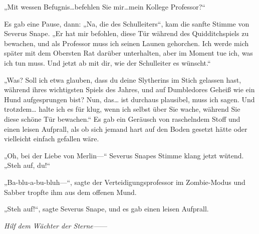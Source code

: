 „Mit wessen Befugnis…befehlen Sie mir…mein Kollege Professor?“

Es gab eine Pause, dann: „Na, die des Schulleiters“, kam die sanfte Stimme von Severus Snape. „Er hat mir befohlen, diese Tür während des Quidditchspiels zu bewachen, und als Professor muss ich seinen Launen gehorchen. Ich werde mich später mit dem Obersten Rat darüber unterhalten, aber im Moment tue ich, was ich tun muss. Und jetzt ab mit dir, wie der Schulleiter es wünscht.“

„Was? Soll ich etwa glauben, dass du deine Slytherins im Stich gelassen hast, während ihres wichtigsten Spiels des Jahres, und auf Dumbledores Geheiß wie ein Hund aufgesprungen bist? Nun, das… ist durchaus plausibel, muss ich sagen. Und trotzdem… halte ich es für klug, wenn ich selbst über Sie wache, während Sie diese schöne Tür bewachen.“
Es gab ein Geräusch von raschelndem Stoff und einen leisen Aufprall, als ob sich jemand hart auf den Boden gesetzt hätte oder vielleicht einfach gefallen wäre.

„Oh, bei der Liebe von Merlin—“ Severus Snapes Stimme klang jetzt wütend. „Steh auf, du!“

„Ba-blu-a-bu-bluh—“, sagte der Verteidigungsprofessor im Zombie-Modus und Sabber tropfte ihm aus dem offenen Mund.

„Steh auf!“, sagte Severus Snape, und es gab einen leisen Aufprall.

\emph{Hilf dem Wächter der Sterne—}—

